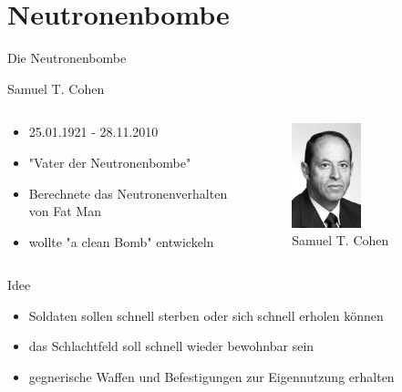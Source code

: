 \section{Neutronenbombe}
\begin{frame}
	\begin{block}{Die Neutronenbombe}
	\end{block}
\end{frame}
\begin{frame}{Samuel T. Cohen}
	\begin{columns}[onlytextwidth]
		\begin{column}{0.45\textwidth}
			\begin{itemize}
				\item 25.01.1921 - 28.11.2010
				\item "Vater der Neutronenbombe"
				\item Berechnete das Neutronenverhalten von Fat Man
				\item wollte "a clean Bomb" entwickeln
			\end{itemize}
		\end{column}
		\begin{column}{0.45\textwidth}
			\begin{figure}
				\centering
				\includegraphics[width=0.5\textwidth]{img/samuel_cohen.jpg}
				\caption{Samuel T. Cohen \cite{JewCurr}}
			\end{figure}
		\end{column}
	\end{columns}
\end{frame}
\begin{frame}{Idee}
	\begin{itemize}
		\item Soldaten sollen schnell sterben oder sich schnell erholen können
		\item das Schlachtfeld soll schnell wieder bewohnbar sein
		\item gegnerische Waffen und Befestigungen zur Eigennutzung erhalten
	\end{itemize}
\end{frame}
